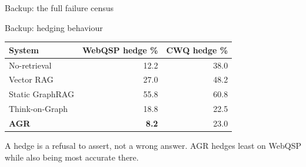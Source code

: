 \documentclass[aspectratio=169,12pt]{beamer}
\begin{document}
\begin{frame}{Backup: the full failure census}
  \centering
  \resizebox{!}{0.80\textheight}{%
    }
\end{frame}

\begin{frame}{Backup: hedging behaviour}
  \begin{table}
    \small
    \begin{tabular}{@{}lrr@{}}
      \toprule
      \textbf{System} & \textbf{WebQSP hedge \%} & \textbf{CWQ hedge \%} \\
      \midrule
      No-retrieval    & 12.2 & 38.0 \\
      Vector RAG      & 27.0 & 48.2 \\
      Static GraphRAG & 55.8 & 60.8 \\
      Think-on-Graph  & 18.8 & 22.5 \\
      \textbf{AGR}    & \textbf{8.2} & 23.0 \\
      \bottomrule
    \end{tabular}
  \end{table}
  {\small A hedge is a refusal to assert, not a wrong answer. AGR hedges least
  on WebQSP while also being most accurate there.}
\end{frame}
\end{document}
